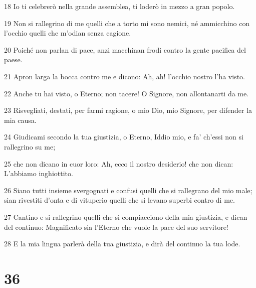 \par 18 Io ti celebrerò nella grande assemblea, ti loderò in mezzo a gran popolo.
\par 19 Non si rallegrino di me quelli che a torto mi sono nemici, né ammicchino con l'occhio quelli che m'odian senza cagione.
\par 20 Poiché non parlan di pace, anzi macchinan frodi contro la gente pacifica del paese.
\par 21 Apron larga la bocca contro me e dicono: Ah, ah! l'occhio nostro l'ha visto.
\par 22 Anche tu hai visto, o Eterno; non tacere! O Signore, non allontanarti da me.
\par 23 Risvegliati, destati, per farmi ragione, o mio Dio, mio Signore, per difender la mia causa.
\par 24 Giudicami secondo la tua giustizia, o Eterno, Iddio mio, e fa' ch'essi non si rallegrino su me;
\par 25 che non dicano in cuor loro: Ah, ecco il nostro desiderio! che non dican: L'abbiamo inghiottito.
\par 26 Siano tutti insieme svergognati e confusi quelli che si rallegrano del mio male; sian rivestiti d'onta e di vituperio quelli che si levano superbi contro di me.
\par 27 Cantino e si rallegrino quelli che si compiacciono della mia giustizia, e dican del continuo: Magnificato sia l'Eterno che vuole la pace del suo servitore!
\par 28 E la mia lingua parlerà della tua giustizia, e dirà del continuo la tua lode.

\chapter{36}

